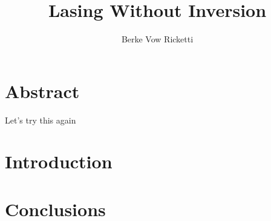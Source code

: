 \documentclass{article}
\title{Lasing Without Inversion}
\author{Berke Vow Ricketti}
\begin{document}
\maketitle{}





\section{Abstract}

Let's try this again
\section{Introduction}


\section{Conclusions}
\end{document}
